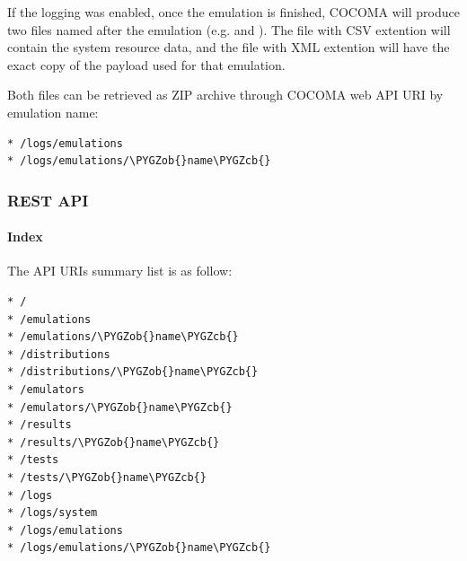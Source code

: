 \documentclass[letterpaper,10pt,english]{sphinxhowto}
\def\PYGZob{\char`\{}
\def\PYGZcb{\char`\}}
\begin{document}
If the logging was enabled, once the emulation is finished, COCOMA will produce two files named after the emulation (e.g.  and ).
The file with CSV extention will contain the system resource data, and the file with XML extention will have the exact copy of the payload used for that emulation.

Both files can be retrieved as ZIP archive through COCOMA web API URI by emulation name:

\begin{Verbatim}[commandchars=\\\{\}]
* /logs/emulations
* /logs/emulations/\PYGZob{}name\PYGZcb{}
\end{Verbatim}


\subsubsection{REST API}
\label{COCOMA/02_how_to_use_it:rest-api}

\paragraph{Index}
\label{COCOMA/02_how_to_use_it:index}
The API URIs summary list is as follow:

\begin{Verbatim}[commandchars=\\\{\}]
* /
* /emulations
* /emulations/\PYGZob{}name\PYGZcb{}
* /distributions
* /distributions/\PYGZob{}name\PYGZcb{}
* /emulators
* /emulators/\PYGZob{}name\PYGZcb{}
* /results
* /results/\PYGZob{}name\PYGZcb{}
* /tests
* /tests/\PYGZob{}name\PYGZcb{}
* /logs
* /logs/system
* /logs/emulations
* /logs/emulations/\PYGZob{}name\PYGZcb{}
\end{Verbatim}
\end{document}
